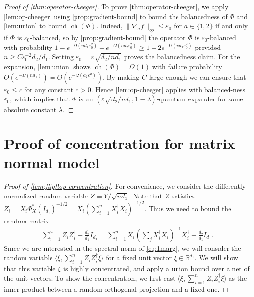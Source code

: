 \documentclass[aos]{imsart}
\theoremstyle{definition}
\numberwithin{equation}{section}
\DeclareMathOperator{\ch}{ch}
\newcommand{\R}{{\mathbb{R}}}
\newcommand{\eps}{\varepsilon}
\begin{document}
\begin{appendix}
\begin{proof}[Proof of \cref{thm:operator-cheeger}]
To prove \cref{thm:operator-cheeger}, we apply \cref{lem:op-cheeger} using \cref{prop:gradient-bound} to bound the balancedness of $\Phi$ and \cref{lem:union} to bound $\ch(\Phi)$. Indeed, $\|\nabla_a f\|_{op} \leq \eps_0$ for $a \in \{1,2\}$ if and only if $\Phi$ is $\eps_0$-balanced, so by \cref{prop:gradient-bound} the operator $\Phi$ is $\eps_0$-balanced with probability $1 -  e^{-\Omega(n d_1 \eps_0^2)} - e^{-\Omega(n d_2 \eps_0^2)} \geq 1 - 2e^{-\Omega(n d_1 \eps_0^2)}$ provided $n \geq C\eps_0^{-2} d_2/d_1 $. Setting $\eps_0 = \eps \sqrt{{d_2 }/{n d_1}}$ proves the balancedness claim. For the expansion, \cref{lem:union} shows $\ch(\Phi) = \Omega(1)$ with failure probability $O(e^{- \Omega(n d_1)}) = O(e^{- \Omega(d_2 \eps^2)})$. By making $C$ large enough we can ensure that $\eps_0 \leq c$ for any constant $c > 0$. Hence \cref{lem:op-cheeger} applies with balanced-ness $\eps_0$, which implies that $\Phi$ is an $(\eps \sqrt{{d_2 }/{n d_1}}, 1 - \lambda)$-quantum expander for some absolute constant $\lambda$.
\end{proof}



\section{Proof of concentration for matrix normal model}\label{app:flipflop-concentration}

\begin{proof}[Proof of \cref{lem:flipflop-concentration}]
For convenience, we consider the differently normalized random variable $Z = Y/\sqrt{nd_1}$. Note that $Z$ satisfies
$Z_i = X_i \Phi_X^*(I_{d_1})^{-1/2} =  X_i (\sum_{i = 1}^n X_i^\dagger X_i)^{-1/2}.$ Thus we need to bound the random matrix
\begin{align} \sum_{i = 1}^n Z_i Z_i^{\dagger} - \frac{d_2}{d_1} I_{d_1} = \sum_{i = 1}^n X_i \left( \sum_{j}  X_i^{\dagger} X_i\right)^{-1} X_i^\dagger - \frac{d_2}{d_1} I_{d_1}.\label{eq:1marg}
\end{align}
Since we are interested in the spectral norm of \cref{eq:1marg}, we will consider the random variable $\langle \xi,  \sum_{i = 1}^n Z_i Z_i^{\dagger} \xi \rangle$ for a fixed unit vector $\xi \in \R^{d_1}$. We will show that this variable $\xi$ is highly concentrated, and apply a union bound over a net of the unit vectors. To show the concentration, we first cast $\langle \xi,  \sum_{i = 1}^n Z_i Z_i^{\dagger} \xi \rangle$ as the inner product between a random orthogonal projection and a fixed one.


\end{proof}
\end{appendix}
\end{document}
